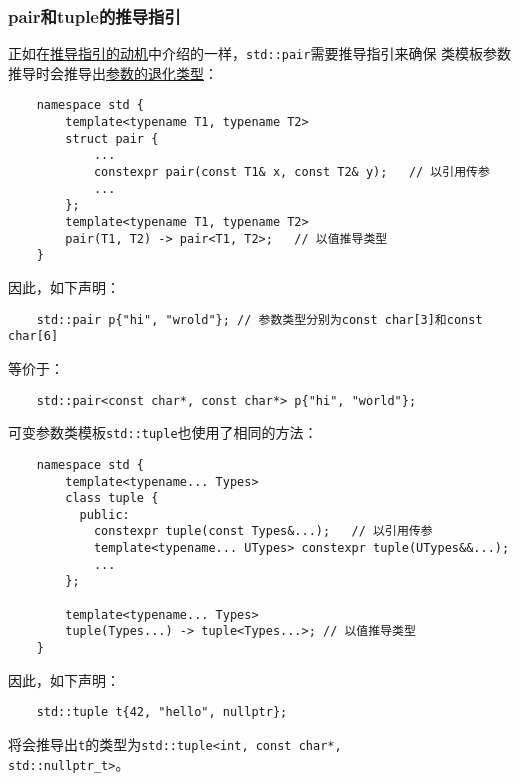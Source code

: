 \subsubsection*{pair和tuple的推导指引}
正如在\hyperref[ch9.1.4]{推导指引的动机}中介绍的一样，\texttt{std::pair}需要推导指引来确保
类模板参数推导时会推导出\hyperref[ch9.2.1]{参数的退化类型}：
\begin{lstlisting}
    namespace std {
        template<typename T1, typename T2>
        struct pair {
            ...
            constexpr pair(const T1& x, const T2& y);   // 以引用传参
            ...
        };
        template<typename T1, typename T2>
        pair(T1, T2) -> pair<T1, T2>;   // 以值推导类型
    }
\end{lstlisting}
因此，如下声明：
\begin{lstlisting}
    std::pair p{"hi", "wrold"}; // 参数类型分别为const char[3]和const char[6]
\end{lstlisting}
等价于：
\begin{lstlisting}
    std::pair<const char*, const char*> p{"hi", "world"};
\end{lstlisting}
可变参数类模板\texttt{std::tuple}也使用了相同的方法：
\begin{lstlisting}
    namespace std {
        template<typename... Types>
        class tuple {
          public:
            constexpr tuple(const Types&...);   // 以引用传参
            template<typename... UTypes> constexpr tuple(UTypes&&...);
            ...
        };

        template<typename... Types>
        tuple(Types...) -> tuple<Types...>; // 以值推导类型
    }
\end{lstlisting}
因此，如下声明：
\begin{lstlisting}
    std::tuple t{42, "hello", nullptr};
\end{lstlisting}
将会推导出\texttt{t}的类型为\texttt{std::tuple<int, const char*, \\std::nullptr\_t>}。

